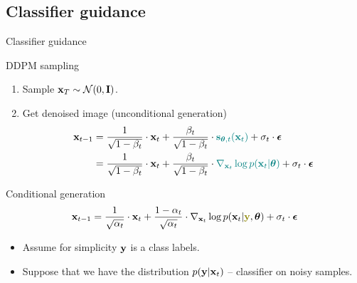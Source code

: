 \subsection{Classifier guidance}
\begin{frame}{Classifier guidance}
	
	\begin{block}{DDPM sampling}
		\begin{enumerate}
			\item Sample $\mathbf{x}_T \sim \mathcal{N}(0, \mathbf{I})$.
			\item Get denoised image (unconditional generation)
			\vspace{-0.3cm}
			\begin{align*}
				\mathbf{x}_{t - 1} &= \frac{1}{\sqrt{1 - \beta_t}} \cdot \mathbf{x}_t + \frac{\beta_t}{\sqrt{1 - \beta_t}} \cdot {\color{teal}\mathbf{s}_{\boldsymbol{\theta}, t} (\mathbf{x}_t)} +  \sigma_t \cdot \boldsymbol{\epsilon} \\
				& = \frac{1}{\sqrt{1 - \beta_t}} \cdot \mathbf{x}_t + \frac{\beta_t}{\sqrt{1 - \beta_t}} \cdot {\color{teal} \nabla_{\mathbf{x}_t} \log p(\mathbf{x}_t | \boldsymbol{\theta})} +  \sigma_t \cdot \boldsymbol{\epsilon}
			\end{align*}
			\vspace{-0.5cm}
		\end{enumerate}
	\end{block}
	\begin{block}{Conditional generation}
		\vspace{-0.3cm}
		\[
			\bx_{t - 1} = \frac{1}{\sqrt{\alpha_t}} \cdot \bx_t + \frac{1 - \alpha_t}{\sqrt{\alpha_t}} \cdot  \nabla_{\bx_t} \log p(\bx_t | {\color{olive}\by}, \btheta) +  \sigma_t \cdot \bepsilon
		\]
		\vspace{-0.5cm}
	\end{block}
	\begin{itemize}
		\item Assume for simplicity $\mathbf{y}$ is a class labels.
		\item Suppose that we have the distribution $p(\mathbf{y} | \mathbf{x}_t)$ -- classifier on noisy samples.
	\end{itemize}
\end{frame}
